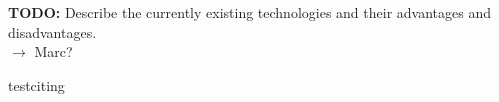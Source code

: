 \textbf{TODO:} Describe the currently existing technologies and their advantages and disadvantages. \\ 
$\rightarrow$ Marc?


testciting \cite{McIntosh:2016:EPH:2858036.2858093}